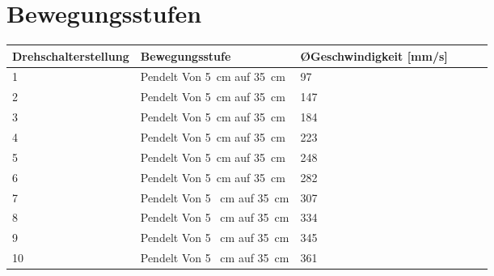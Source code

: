 %
%

\chapter{Bewegungsstufen} \label{bew}


\fontsize{8}{10}\selectfont
\begin{tabularx}{\textwidth}{|p{3cm}|X|X|X|p{1cm}|X|}
	\hline 
	\textbf{Drehschalterstellung}  & \textbf{Bewegungsstufe} & \textbf{ \O Geschwindigkeit [mm/s]}    \\ \hline
	1 & Pendelt Von 5\ cm auf 35\ cm & 97   \\
	\hline
	2 & Pendelt Von 5\ cm auf 35\ cm & 147 \\
	\hline
	3 & Pendelt Von 5\ cm auf 35\ cm & 184 \\
	\hline
	4 & Pendelt Von 5\ cm auf 35\ cm & 223 \\
	\hline
	5 & Pendelt Von 5\ cm auf 35\ cm & 248 \\
	\hline
	6 & Pendelt Von 5\ cm auf 35\ cm & 282 \\
	\hline
	7 & Pendelt Von 5 \ cm auf 35\ cm & 307 \\
	\hline
	8 & Pendelt Von 5 \ cm auf 35\ cm & 334\\
	\hline
	9 & Pendelt Von 5 \ cm auf 35\ cm & 345 \\
	\hline
	10 & Pendelt Von 5 \ cm auf 35\ cm & 361 \\
	\hline
	
	
\end{tabularx}




